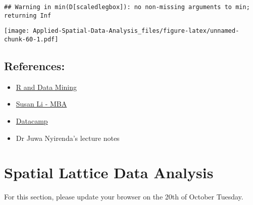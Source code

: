 \documentclass[
]{book}
\providecommand{\tightlist}{%
  \setlength{\itemsep}{0pt}\setlength{\parskip}{0pt}}
\begin{document}
\begin{verbatim}
## Warning in min(D[scaledlegbox]): no non-missing arguments to min; returning Inf
\end{verbatim}

\texttt{[image: Applied-Spatial-Data-Analysis\_files/figure-latex/unnamed-chunk-60-1.pdf]}

\hypertarget{references}{%
\section{References:}\label{references}}

\begin{itemize}
\tightlist
\item
  \href{http://www.rdatamining.com/examples/association-rules}{R and Data Mining}
\item
  \href{https://github.com/susanli2016/Data-Analysis-with-R/blob/master/Market_Basket_Analysis.Rmd}{Susan Li - MBA}
\item
  \href{https://www.datacamp.com/community/tutorials/market-basket-analysis-r}{Datacamp}
\item
  Dr Juwa Nyirenda's lecture notes
\end{itemize}

\hypertarget{spatial-lattice-data-analysis}{%
\chapter{Spatial Lattice Data Analysis}\label{spatial-lattice-data-analysis}}

For this section, please update your browser on the 20th of October Tuesday.

  
\end{document}
